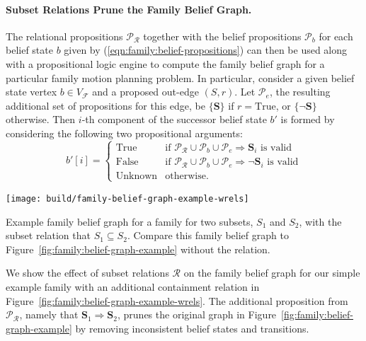 \paragraph{Subset Relations Prune the Family Belief Graph.}
The relational propositions $\mathcal{P}_{\mathcal{R}}$
together with the belief propositions $\mathcal{P}_b$ for
each belief state $b$ given by (\ref{eqn:family:belief-propositions})
can then be used along with a propositional
logic engine to compute the family belief graph
for a particular family motion planning problem.
In particular,
consider a given belief state vertex $b \in V_{\mathcal{F}}$
and a proposed out-edge $(S,r)$.
Let $\mathcal{P}_e$,
the resulting additional set of propositions for this edge,
be $\{ \mathbf{S} \}$ if $r = \mbox{True}$,
or $\{ \lnot\mathbf{S} \}$ otherwise.
Then $i$-th component of the successor belief state $b'$
is formed by considering the following two propositional arguments:
\begin{equation}
   b'[i] = \left\{ \begin{array}{cl}
   \mbox{True}
      & \mbox{if }
      \mathcal{P}_{\mathcal{R}} \cup \mathcal{P}_b \cup \mathcal{P}_e
         \Rightarrow \mathbf{S}_i
      \mbox{ is valid} \\
   \mbox{False}
      & \mbox{if }
      \mathcal{P}_{\mathcal{R}} \cup \mathcal{P}_b \cup \mathcal{P}_e
         \Rightarrow \lnot\mathbf{S}_i
      \mbox{ is valid} \\
   \mbox{Unknown}
      & \mbox{otherwise.}
   \end{array} \right.
\end{equation}

\begin{marginfigure}
   \centering
   \texttt{[image: build/family-belief-graph-example-wrels]}
   \caption{Example family belief graph
      for a family for two subsets, $S_1$ and $S_2$,
      with the subset relation that $S_1 \subseteq S_2$.
      Compare this family belief graph
      to Figure~\ref{fig:family:belief-graph-example}
      without the relation.}
   \label{fig:family:belief-graph-example-wrels}
\end{marginfigure}

We show the effect of subset relations $\mathcal{R}$
on the family belief graph for our simple example family
with an additional containment relation
in Figure~\ref{fig:family:belief-graph-example-wrels}.
The additional proposition from $\mathcal{P}_{\mathcal{R}}$,
namely that $\mathbf{S}_1 \Rightarrow \mathbf{S}_2$,
prunes the original graph
in Figure~\ref{fig:family:belief-graph-example}
by removing inconsistent belief states and transitions.


